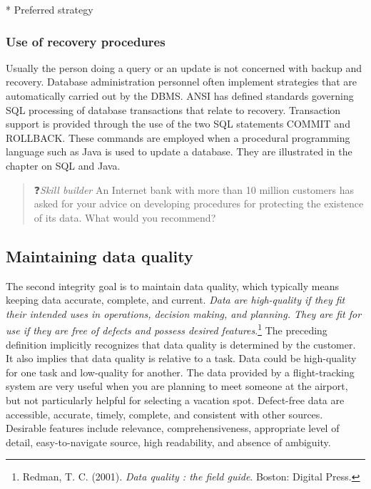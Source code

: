 \documentclass[
]{article}
\begin{document}
* Preferred strategy

\hypertarget{use-of-recovery-procedures}{%
\subsubsection*{Use of recovery procedures}\label{use-of-recovery-procedures}}

Usually the person doing a query or an update is not concerned with
backup and recovery. Database administration personnel often implement
strategies that are automatically carried out by the DBMS. ANSI has
defined standards governing SQL processing of database transactions that
relate to recovery. Transaction support is provided through the use of
the two SQL statements COMMIT and ROLLBACK. These commands are employed
when a procedural programming language such as Java is used to update a
database. They are illustrated in the chapter on SQL and Java.

\begin{quote}
❓\emph{Skill builder} An Internet bank with more than 10 million customers
has asked for your advice on developing procedures for protecting the
existence of its data. What would you recommend?
\end{quote}

\hypertarget{maintaining-data-quality}{%
\subsection*{Maintaining data quality}\label{maintaining-data-quality}}

The second integrity goal is to maintain data quality, which typically
means keeping data accurate, complete, and current. \emph{Data are
high-quality if they fit their intended uses in operations, decision
making, and planning. They are fit for use if they are free of defects
and possess desired features}.\footnote{Redman, T. C. (2001). \emph{Data quality : the field guide}. Boston:
  Digital Press.} The preceding definition implicitly
recognizes that data quality is determined by the customer. It also
implies that data quality is relative to a task. Data could be
high-quality for one task and low-quality for another. The data provided
by a flight-tracking system are very useful when you are planning to
meet someone at the airport, but not particularly helpful for selecting
a vacation spot. Defect-free data are accessible, accurate, timely,
complete, and consistent with other sources. Desirable features include
relevance, comprehensiveness, appropriate level of detail,
easy-to-navigate source, high readability, and absence of ambiguity.
\end{document}

